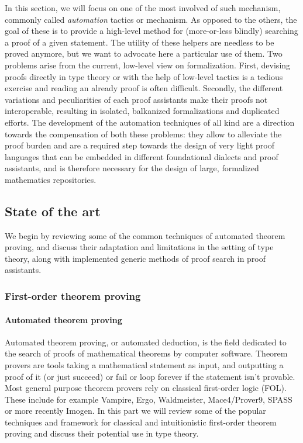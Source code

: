 \documentclass[twoside,a4paper,12pt]{article}
\begin{document}
In this section, we will focus on one of the most involved of such
mechanism, commonly called \emph{automation} tactics or mechanism. As
opposed to the others, the goal of these is to provide a high-level
method for (more-or-less blindly) searching a proof of a given
statement. The utility of these helpers are needless to be proved
anymore, but we want to advocate here a particular use of them. Two
problems arise from the current, low-level view on formalization.
First, devising proofs directly in type theory or with the help of
low-level tactics is a tedious exercise and reading an already proof
is often difficult. Secondly, the different variations and
peculiarities of each proof assistants make their proofs not
interoperable, resulting in isolated, balkanized formalizations and
duplicated efforts. The development of the automation techniques of
all kind are a direction towards the compensation of both these
problems: they allow to alleviate the proof burden and are a required
step towards the design of very light proof languages that can be
embedded in different foundational dialects and proof assistants, and
is therefore necessary for the design of large, formalized mathematics
repositories.

\subsection{State of the art}

We begin by reviewing some of the common techniques of automated
theorem proving, and discuss their adaptation and limitations in the
setting of type theory, along with implemented generic methods of
proof search in proof assistants.

\subsubsection{First-order theorem proving}

\paragraph{Automated theorem proving}

Automated theorem proving, or automated deduction, is the field
dedicated to the search of proofs of mathematical theorems by computer
software. Theorem provers are tools taking a mathematical statement as
input, and outputting a proof of it (or just succeed) or fail or loop
forever if the statement isn't provable. Most general purpose theorem
provers rely on classical first-order logic (FOL).  These include for
example \textsf{Vampire}, \textsf{Ergo}, \textsf{Waldmeister},
\textsf{Mace4/Prover9}, \textsf{SPASS} or more recently
\textsf{Imogen}. In this part we will review some of the popular
techniques and framework for classical and intuitionistic first-order
theorem proving and discuss their potential use in type theory.
\end{document}
